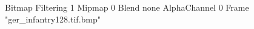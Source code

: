 {Bitmap
	{Filtering 1}
	{Mipmap 0}
	{Blend none}
	{AlphaChannel 0}
	{Frame "ger_infantry128.tif.bmp"}
}
